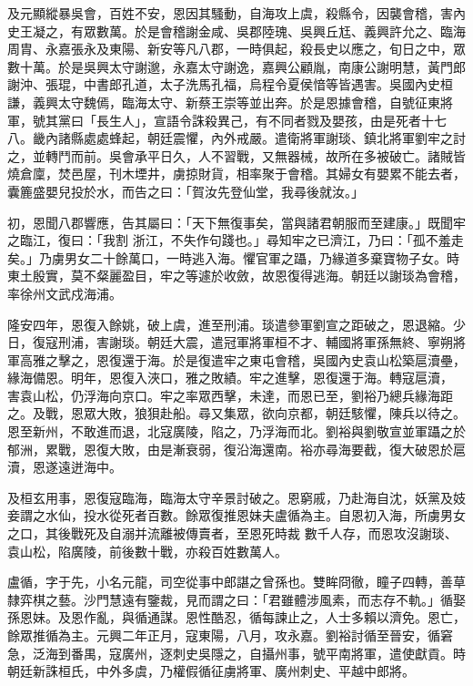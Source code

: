 \begin{pinyinscope}
 及元顯縱暴吳會，百姓不安，恩因其騷動，自海攻上虞，殺縣令，因襲會稽，害內史王凝之，有眾數萬。於是會稽謝金咸、吳郡陸瑰、吳興丘尪、義興許允之、臨海周胄、永嘉張永及東陽、新安等凡八郡，一時俱起，殺長史以應之，旬日之中，眾數十萬。於是吳興太守謝邈，永嘉太守謝逸，嘉興公顧胤，南康公謝明慧，黃門郎謝沖、張琨，中書郎孔道，太子洗馬孔福，烏程令夏侯愔等皆遇害。吳國內史桓
 謙，義興太守魏傿，臨海太守、新蔡王崇等並出奔。於是恩據會稽，自號征東將軍，號其黨曰「長生人」，宣語令誅殺異己，有不同者戮及嬰孩，由是死者十七八。畿內諸縣處處蜂起，朝廷震懼，內外戒嚴。遣衛將軍謝琰、鎮北將軍劉牢之討之，並轉鬥而前。吳會承平日久，人不習戰，又無器械，故所在多被破亡。諸賊皆燒倉廩，焚邑屋，刊木堙井，虜掠財貨，相率聚于會稽。其婦女有嬰累不能去者，囊簏盛嬰兒投於水，而告之曰：「賀汝先登仙堂，我尋後就汝。」



 初，恩聞八郡響應，告其屬曰：「天下無復事矣，當與諸君朝服而至建康。」既聞牢之臨江，復曰：「我割
 浙江，不失作句踐也。」尋知牢之已濟江，乃曰：「孤不羞走矣。」乃虜男女二十餘萬口，一時逃入海。懼官軍之躡，乃緣道多棄寶物子女。時東土殷實，莫不粲麗盈目，牢之等遽於收斂，故恩復得逃海。朝廷以謝琰為會稽，率徐州文武戍海浦。



 隆安四年，恩復入餘姚，破上虞，進至刑浦。琰遣參軍劉宣之距破之，恩退縮。少日，復寇刑浦，害謝琰。朝廷大震，遣冠軍將軍桓不才、輔國將軍孫無終、寧朔將軍高雅之擊之，恩復還于海。於是復遣牢之東屯會稽，吳國內史袁山松築扈瀆壘，緣海備恩。明年，恩復入浹口，雅之敗績。牢之進擊，恩復還于海。轉寇扈瀆，
 害袁山松，仍浮海向京口。牢之率眾西擊，未達，而恩已至，劉裕乃總兵緣海距之。及戰，恩眾大敗，狼狽赴船。尋又集眾，欲向京都，朝廷駭懼，陳兵以待之。恩至新州，不敢進而退，北寇廣陵，陷之，乃浮海而北。劉裕與劉敬宣並軍躡之於郁洲，累戰，恩復大敗，由是漸衰弱，復沿海還南。裕亦尋海要截，復大破恩於扈瀆，恩遂遠迸海中。



 及桓玄用事，恩復寇臨海，臨海太守辛景討破之。恩窮戚，乃赴海自沈，妖黨及妓妾謂之水仙，投水從死者百數。餘眾復推恩妹夫盧循為主。自恩初入海，所虜男女之口，其後戰死及自溺并流離被傳賣者，至恩死時裁
 數千人存，而恩攻沒謝琰、袁山松，陷廣陵，前後數十戰，亦殺百姓數萬人。



 盧循，字于先，小名元龍，司空從事中郎諶之曾孫也。雙眸冏徹，瞳子四轉，善草隸弈棋之藝。沙門慧遠有鑒裁，見而謂之曰：「君雖體涉風素，而志存不軌。」循娶孫恩妹。及恩作亂，與循通謀。恩性酷忍，循每諫止之，人士多賴以濟免。恩亡，餘眾推循為主。元興二年正月，寇東陽，八月，攻永嘉。劉裕討循至晉安，循窘急，泛海到番禺，寇廣州，逐刺史吳隱之，自攝州事，號平南將軍，遣使獻貢。時
 朝廷新誅桓氏，中外多虞，乃權假循征虜將軍、廣州刺史、平越中郎將。




\end{pinyinscope}
